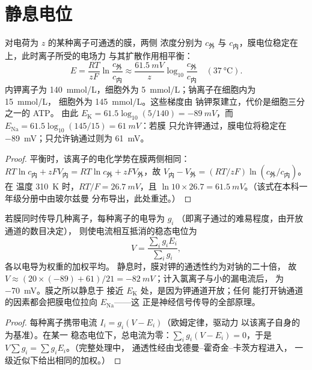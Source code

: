 \section{静息电位}

\begin{theorem}[能斯特电位]\label{thm:b2:neurons-synapses:nernst}
对电荷为 $z$ 的某种离子可通透的膜，两侧
浓度分别为 $c_{\text{外}}$ 与 $c_{\text{内}}$，膜电位稳定在
\emph{}上，此时离子所受的电场力
与其扩散作用相平衡：
\[
E = \frac{RT}{zF}\ln\frac{c_{\text{外}}}{c_{\text{内}}} \approx \frac{\qty{61.5}{mV}}{z}\log_{10}\frac{c_{\text{外}}}{c_{\text{内}}} \quad (\qty{37}{\celsius}).
\]
内钾离子为 \qty{140}{mmol/L}，细胞外为
\qty{5}{mmol/L}；钠离子在细胞内为 \qty{15}{mmol/L}，
细胞外为 \qty{145}{mmol/L}。这些梯度由
钠钾泵建立，代价是细胞三分之一的 ATP。
由此 $E_{\mathrm K} = 61.5\log_{10}(5/140) = \qty{-89}{mV}$，而
$E_{\mathrm{Na}} = 61.5\log_{10}(145/15) = \qty{+61}{mV}$：若膜
只允许钾通过，膜电位将稳定在
\qty{-89}{mV}；只允许钠通过则为 \qty{+61}{mV}。
\end{theorem}
\begin{proof}
平衡时，该离子的电化学势在膜两侧相同：
$RT\ln c_{\text{内}} + zFV_{\text{内}} = RT\ln
c_{\text{外}} + zFV_{\text{外}}$，故 $V_{\text{内}} -
V_{\text{外}} = (RT/zF)\ln(c_{\text{外}}/c_{\text{内}})$。在
温度 \qty{310}{K} 时，$RT/F = \qty{26.7}{mV}$，且 $\ln 10 \times 26.7 =
\qty{61.5}{mV}$。（该式在本科一年级分册中由玻尔兹曼
分布导出，此处重述。）
\end{proof}

\begin{theorem}[作为加权平均的静息电位]\label{thm:b2:neurons-synapses:chord}
若膜同时传导几种离子，每种离子的电导为 $g_i$
（即离子通过的难易程度，由开放通道的数目决定），
则使电流相互抵消的稳态电位为
\[
V = \frac{\sum_i g_i E_i}{\sum_i g_i},
\]
各以电导为权重的加权平均。
静息时，膜对钾的通透性约为对钠的二十倍，
故 $V \approx (20\times(-89) +
61)/21 = \qty{-82}{mV}$；计入氯离子与小的漏电流后，
为 \qty{-70}{mV}。膜之所以静息于
接近 $E_{\mathrm K}$ 处，是因为钾通道开放；任何
能打开钠通道的因素都会把膜电位拉向 $E_{\mathrm{Na}}$——这
正是神经信号传导的全部原理。
\end{theorem}
\begin{proof}
每种离子携带电流 $I_i = g_i(V - E_i)$（欧姆定律，驱动力
以该离子自身的为基准）。在某一
稳态电位下，总电流为零：$\sum_i g_i(V - E_i) =
0$，于是 $V\sum g_i = \sum g_iE_i$。（完整处理中，
通透性经由戈德曼–霍奇金–卡茨方程进入，
一级近似下给出相同的加权。）
\end{proof}

